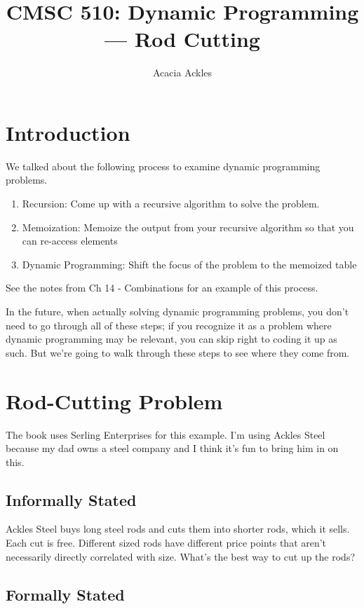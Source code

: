 \documentclass[]{article}
\title{CMSC 510: Dynamic Programming --- Rod Cutting}
\author{Acacia Ackles}
\begin{document}
\maketitle

\section*{Introduction}

We talked about the following process to examine dynamic programming problems.

\begin{enumerate}
    \item Recursion: Come up with a recursive algorithm to solve the problem.
    \item Memoization: Memoize the output from your recursive algorithm so that you can re-access elements
    \item Dynamic Programming: Shift the focus of the problem to the memoized table
\end{enumerate}

See the notes from Ch 14 - Combinations for an example of this process.

In the future, when actually solving dynamic programming problems, you don't need to go through all of these steps; if you recognize it as a problem where dynamic programming may be relevant, you can skip right to coding it up as such. But we're going to walk through these steps to see where they come from. 

\section*{Rod-Cutting Problem}

The book uses Serling Enterprises for this example. I'm using Ackles Steel because my dad owns a steel company and I think it's fun to bring him in on this. 

\subsection*{Informally Stated}

Ackles Steel buys long steel rods and cuts them into shorter rods, which it sells. Each cut is free. Different sized rods have different price points that aren't necessarily directly correlated with size. What's the best way to cut up the rods? 

\subsection*{Formally Stated}
\end{document}
